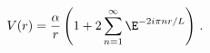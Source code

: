 \begin{equation}
V(r) = \frac{\alpha}{r} \left( 1 + 2\sum_{n=1}^\infty
       \E^{-2i\pi nr/L} \right) \, .
\label{eq50}
\end{equation}

